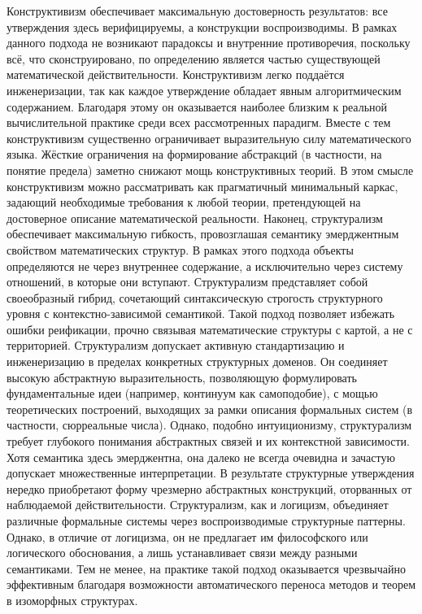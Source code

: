 \documentclass[12pt]{article}
\begin{document}
Конструктивизм обеспечивает максимальную достоверность результатов: все утверждения здесь верифицируемы, а конструкции воспроизводимы. В рамках данного подхода не возникают парадоксы и внутренние противоречия, поскольку всё, что сконструировано, по определению является частью существующей математической действительности. Конструктивизм легко поддаётся инженеризации, так как каждое утверждение обладает явным алгоритмическим содержанием. Благодаря этому он оказывается наиболее близким к реальной вычислительной практике среди всех рассмотренных парадигм. Вместе с тем конструктивизм существенно ограничивает выразительную силу математического языка. Жёсткие ограничения на формирование абстракций (в частности, на понятие предела) заметно снижают мощь конструктивных теорий. В этом смысле конструктивизм можно рассматривать как прагматичный минимальный каркас, задающий необходимые требования к любой теории, претендующей на достоверное описание математической реальности. Наконец, структурализм обеспечивает максимальную гибкость, провозглашая семантику эмерджентным свойством математических структур. В рамках этого подхода объекты определяются не через внутреннее содержание, а исключительно через систему отношений, в которые они вступают. Структурализм представляет собой своеобразный гибрид, сочетающий синтаксическую строгость структурного уровня с контекстно-зависимой семантикой. Такой подход позволяет избежать ошибки реификации, прочно связывая математические структуры с картой, а не с территорией. Структурализм допускает активную стандартизацию и инженеризацию в пределах конкретных структурных доменов. Он соединяет высокую абстрактную выразительность, позволяющую формулировать фундаментальные идеи (например, континуум как самоподобие), с мощью теоретических построений, выходящих за рамки описания формальных систем (в частности, сюрреальные числа). Однако, подобно интуиционизму, структурализм требует глубокого понимания абстрактных связей и их контекстной зависимости. Хотя семантика здесь эмерджентна, она далеко не всегда очевидна и зачастую допускает множественные интерпретации. В результате структурные утверждения нередко приобретают форму чрезмерно абстрактных конструкций, оторванных от наблюдаемой действительности. Структурализм, как и логицизм, объединяет различные формальные системы через воспроизводимые структурные паттерны. Однако, в отличие от логицизма, он не предлагает им философского или логического обоснования, а лишь устанавливает связи между разными семантиками. Тем не менее, на практике такой подход оказывается чрезвычайно эффективным благодаря возможности автоматического переноса методов и теорем в изоморфных структурах.
\end{document}
